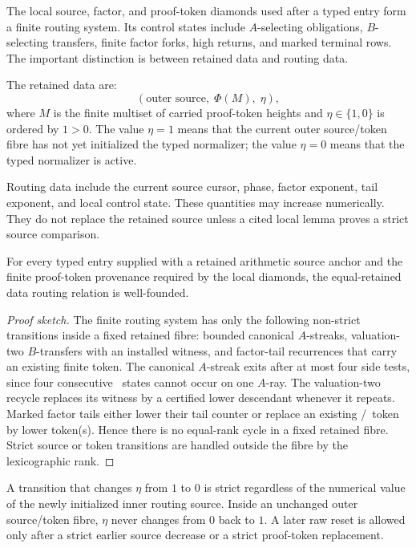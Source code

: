 The local source, factor, and proof-token diamonds used after a typed entry form
a finite routing system. Its control states include $A$-selecting obligations,
$B$-selecting transfers, finite factor forks, high returns, and marked terminal
rows. The important distinction is between retained data and routing data.

The retained data are:
\[
  (\text{outer source},\; \Phi(M),\;\eta),
\]
where $M$ is the finite multiset of carried proof-token heights and
$\eta\in\{1,0\}$ is ordered by $1>0$. The value $\eta=1$ means that the current
outer source/token fibre has not yet initialized the typed normalizer; the
value $\eta=0$ means that the typed normalizer is active.

Routing data include the current source cursor, phase, factor exponent, tail
exponent, and local control state. These quantities may increase numerically.
They do not replace the retained source unless a cited local lemma proves a
strict source comparison.

\begin{proposition}\label{prop:typed-normalizer}
For every typed entry supplied with a retained arithmetic source anchor and the
finite proof-token provenance required by the local diamonds, the equal-retained
data routing relation is well-founded.
\end{proposition}

\begin{proof}[Proof sketch]
The finite routing system has only the following non-strict transitions inside a
fixed retained fibre: bounded canonical $A$-streaks, valuation-two $B$-transfers
with an installed witness, and factor-tail recurrences that carry an existing
finite token. The canonical $A$-streak exits after at most four side tests, since
four consecutive \WIN\ states cannot occur on one $A$-ray. The valuation-two
recycle replaces its witness by a certified lower descendant whenever it repeats.
Marked factor tails either lower their tail counter or replace an existing
\WIN/\LOSS\ token by lower token(s). Hence there is no equal-rank cycle in a
fixed retained fibre. Strict source or token transitions are handled outside the
fibre by the lexicographic rank.
\end{proof}

\begin{lemma}\label{lem:eta}
A transition that changes $\eta$ from $1$ to $0$ is strict regardless of the
numerical value of the newly initialized inner routing source. Inside an
unchanged outer source/token fibre, $\eta$ never changes from $0$ back to $1$.
A later raw reset is allowed only after a strict earlier source decrease or a
strict proof-token replacement.
\end{lemma}

